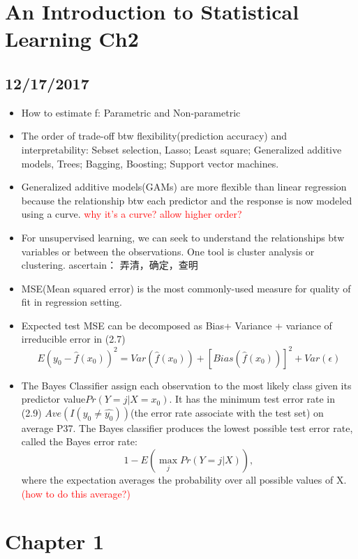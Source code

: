 \documentclass[a4paper, 12pt]{article}
\begin{document}
\section*{An Introduction to Statistical Learning Ch2}
\subsection{12/17/2017}
\begin{itemize}
	\item How to estimate f: Parametric and Non-parametric
	\item The order of trade-off btw flexibility(prediction accuracy) and interpretability: Sebset selection, Lasso; Least square; Generalized additive models, Trees; Bagging, Boosting; Support vector machines.
	\item Generalized additive models(GAMs) are more flexible than linear regression because the relationship btw each predictor and the response is now modeled using a curve. \textcolor{red} {why it's a curve? allow higher order?}
	\item For unsupervised learning, we can seek to understand the relationships btw variables or between the observations. One tool is cluster analysis or clustering. ascertain： 弄清，确定，查明
	\item MSE(Mean squared error) is the most commonly-used measure for quality of fit in regression setting.
	\item Expected test MSE can be decomposed as Bias+ Variance + variance of irreducible error in (2.7)
	\[
	E(y_0-\hat{f}(x_0))^2=Var(\hat{f}(x_0)) +[Bias(\hat{f}(x_0))]^2 +Var(\epsilon)
	\]
	\item The Bayes Classifier assign each observation to the most likely class given its predictor value$Pr(Y=j|X=x_0)$. It has the minimum test error rate in (2.9) $	Ave(I(y_0\ne \hat{y_0}))$(the error rate associate with the test set) on average P37. The Bayes classifier produces the lowest possible test error rate, called the Bayes error rate: 
	\[
	1-E(\displaystyle{\max_{j}} Pr(Y=j|X)),
	\]
	where the expectation averages the probability over all possible values of X. \textcolor{red}{(how to do this average?)}
\end{itemize}


	
	
	

\section*{Chapter 1} %
\end{document}
